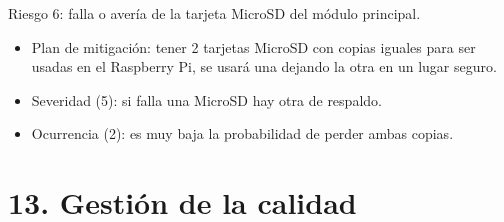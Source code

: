 \documentclass[11pt]{charter}
\begin{document}
Riesgo 6: falla o avería de la tarjeta MicroSD del módulo principal.
\begin{itemize}
\item Plan de mitigación: tener 2 tarjetas MicroSD con copias iguales para ser usadas en el Raspberry Pi, se usará una dejando la otra en un lugar seguro.
\item Severidad (5): si falla una MicroSD hay otra de respaldo.
\item Ocurrencia (2): es muy baja la probabilidad de perder ambas copias.
\end{itemize}




\section{13. Gestión de la calidad}
\label{sec:calidad}
\end{document}
